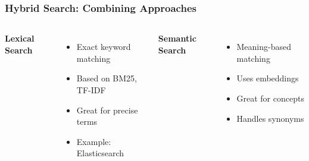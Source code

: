 
\begin{frame}
    \frametitle{Hybrid Search: Combining Approaches}
    \begin{columns}
        \textbf{Lexical Search}
        \begin{itemize}
            \item Exact keyword matching
            \item Based on BM25, TF-IDF
            \item Great for precise terms
            \item Example: Elasticsearch
        \end{itemize}
        
        \textbf{Semantic Search}
        \begin{itemize}
            \item Meaning-based matching
            \item Uses embeddings
            \item Great for concepts
            \item Handles synonyms
        \end{itemize}
    \end{columns}
    
    \vspace{0.5cm}
    \begin{center}
    \end{center}
\end{frame}

